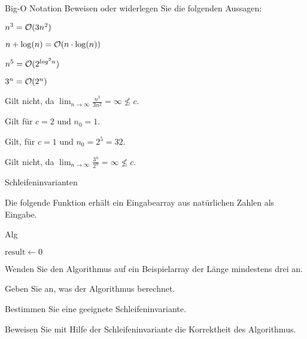 \documentclass{exercisesheet}
\begin{document}
\begin{eexercises}{Big-O Notation}{
    Beweisen oder widerlegen Sie die folgenden Aussagen:
  }
  \item $n^3 = \mathcal{O}(3n^2)$
  \item $n + \log(n) = \mathcal{O}(n \cdot \log(n))$
  \item $n^5 = \mathcal{O}(2^{log^2{n}})$
  \item $3^n = \mathcal{O}(2^n)$
\end{eexercises}

\begin{solutions}
  \item Gilt nicht, da $\lim_{n\to\infty} \frac{n^3}{3n^2} = \infty \not\le c$.
  \item Gilt für $c = 2$ und $n_0 = 1$.
  \item Gilt, für $c = 1$ und $n_0 = 2^5 = 32$.
  \item Gilt nicht, da $\lim_{n\to\infty} \frac{3^n}{2^n} = \infty \not\le c$.
\end{solutions}

\begin{eexercises}{Schleifeninvarianten}{
    Die folgende Funktion erhält ein Eingabearray aus natürlichen Zahlen als Eingabe.
    \begin{algorithm}[ht]
      \caption{Alg}
      $\text{result} \gets 0$ \\
    \end{algorithm}
  }
  \item Wenden Sie den Algorithmus auf ein Beispielarray der Länge mindestens drei an.
  \item Geben Sie an, was der Algorithmus berechnet.
  \item Bestimmen Sie eine geeignete Schleifeninvariante.
  \item Beweisen Sie mit Hilfe der Schleifeninvariante die Korrektheit des Algorithmus.
\end{eexercises}
\end{document}
